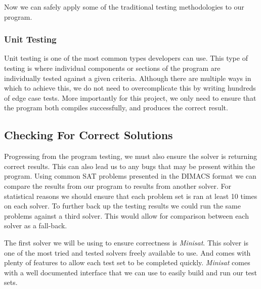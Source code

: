 \documentclass{article}
\begin{document}

Now we can safely apply some of the traditional testing methodologies to our program.

\subsubsection{Unit Testing}
Unit testing is one of the most common types developers can use. This type of testing is where individual components or sections 
of the program are individually tested against a given criteria. Although there are multiple ways in which to achieve this, we do 
not need to overcomplicate this by writing hundreds of edge case tests. More importantly for this project, we only need to ensure 
that the program both compiles successfully, and produces the correct result.


\subsection{Checking For Correct Solutions}
Progressing from the program testing, we must also ensure the solver is returning correct results.
This can also lead us to any bugs that may be present within the program. Using common SAT problems
presented in the DIMACS format we can compare the results from our program to results from another
solver. For statistical reasons we should ensure that each problem set is ran at least 10 times on
each solver. To further back up the testing results we could run the same problems against a third
solver. This would allow for comparison between each solver as a fall-back.

The first solver we will be using to ensure correctness is \textit{Minisat}. This solver is one of
the most tried and tested solvers freely available to use. And comes with plenty of features to
allow each test set to be completed quickly. \textit{Minisat} comes with a well documented interface
that we can use to easily build and run our test sets.

\end{document}
